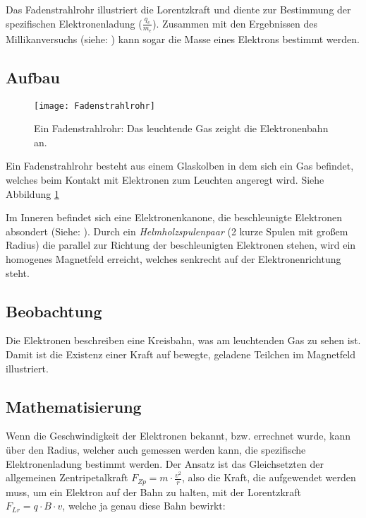 Das Fadenstrahlrohr illustriert die Lorentzkraft und diente zur Bestimmung der spezifischen Elektronenladung ($\frac{q_e}{m_e}$). Zusammen mit den Ergebnissen des Millikanversuchs (siehe: ) kann sogar die Masse eines Elektrons bestimmt werden.

\subsection{Aufbau}

\begin{figure}[h!]
	\centering
	\texttt{[image: Fadenstrahlrohr]}
	\caption{Ein Fadenstrahlrohr: Das leuchtende Gas zeight die Elektronenbahn an.}
	\label{fig:Fadenstrahlrohr}
\end{figure}

Ein Fadenstrahlrohr besteht aus einem Glaskolben in dem sich ein Gas befindet, welches beim Kontakt mit Elektronen zum Leuchten angeregt wird. Siehe Abbildung \ref{fig:Fadenstrahlrohr}

Im Inneren befindet sich eine Elektronenkanone, die beschleunigte Elektronen absondert (Siehe: ). Durch ein \emph{Helmholzspulenpaar} (2 kurze Spulen mit großem Radius) die parallel zur Richtung der beschleunigten Elektronen stehen, wird ein homogenes Magnetfeld erreicht, welches senkrecht auf der Elektronenrichtung steht.

\subsection{Beobachtung}

Die Elektronen beschreiben eine Kreisbahn, was am leuchtenden Gas zu sehen ist. Damit ist die Existenz einer Kraft auf bewegte, geladene Teilchen im Magnetfeld illustriert.

\subsection{Mathematisierung}

Wenn die Geschwindigkeit der Elektronen bekannt, bzw. errechnet wurde, kann über den Radius, welcher auch gemessen werden kann, die spezifische Elektronenladung bestimmt werden. Der Ansatz ist das Gleichsetzten der allgemeinen Zentripetalkraft $F_{Zp} = m \cdot \frac{v^2}{r}$, also die Kraft, die aufgewendet werden muss, um ein Elektron auf der Bahn zu halten, mit der Lorentzkraft  $F_{Lr} = q \cdot B \cdot v$, welche ja genau diese Bahn bewirkt:

